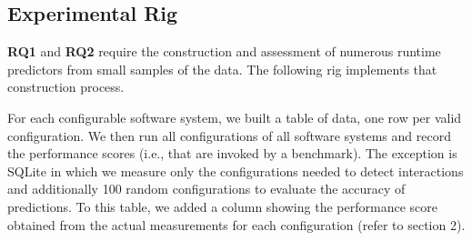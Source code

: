 \documentclass{sig-alternative}
\begin{document}
\subsection{Experimental Rig}


{\bf RQ1} and {\bf RQ2} require the construction and assessment of numerous runtime predictors from small samples
of the data. The following rig implements that construction process.

For each configurable software system, we built a table of data, one row per valid configuration. We then run all configurations of all software systems
and record the performance scores (i.e., that are invoked by a benchmark).
The exception is SQLite in which we measure only the
configurations needed to detect interactions and additionally
100 random configurations to evaluate the accuracy of
predictions.  
To this table, we added a column showing the performance score obtained from the actual measurements for each configuration (refer to section 2).
\end{document}
